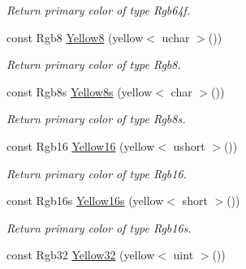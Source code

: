 \begin{DoxyCompactItemize}
\begin{DoxyCompactList}\small\item\em Return primary color of type Rgb64f. \end{DoxyCompactList}\item 
\hypertarget{group___primary_colors_gaa477e057905085ce9d5caa25e59b4d8e}{const Rgb8 \hyperlink{group___primary_colors_gaa477e057905085ce9d5caa25e59b4d8e}{Yellow8} (yellow$<$ uchar $>$())}\label{group___primary_colors_gaa477e057905085ce9d5caa25e59b4d8e}

\begin{DoxyCompactList}\small\item\em Return primary color of type Rgb8. \end{DoxyCompactList}\item 
\hypertarget{group___primary_colors_ga727cf787d43d7c9830a402d272403450}{const Rgb8s \hyperlink{group___primary_colors_ga727cf787d43d7c9830a402d272403450}{Yellow8s} (yellow$<$ char $>$())}\label{group___primary_colors_ga727cf787d43d7c9830a402d272403450}

\begin{DoxyCompactList}\small\item\em Return primary color of type Rgb8s. \end{DoxyCompactList}\item 
\hypertarget{group___primary_colors_gaa53c83b51a45b11eecace384bcca8dc8}{const Rgb16 \hyperlink{group___primary_colors_gaa53c83b51a45b11eecace384bcca8dc8}{Yellow16} (yellow$<$ ushort $>$())}\label{group___primary_colors_gaa53c83b51a45b11eecace384bcca8dc8}

\begin{DoxyCompactList}\small\item\em Return primary color of type Rgb16. \end{DoxyCompactList}\item 
\hypertarget{group___primary_colors_ga6746cbfaacce6d8bd3784dadc6565a35}{const Rgb16s \hyperlink{group___primary_colors_ga6746cbfaacce6d8bd3784dadc6565a35}{Yellow16s} (yellow$<$ short $>$())}\label{group___primary_colors_ga6746cbfaacce6d8bd3784dadc6565a35}

\begin{DoxyCompactList}\small\item\em Return primary color of type Rgb16s. \end{DoxyCompactList}\item 
\hypertarget{group___primary_colors_ga0bb20242e3e6cbf8e59716a25fb1e38f}{const Rgb32 \hyperlink{group___primary_colors_ga0bb20242e3e6cbf8e59716a25fb1e38f}{Yellow32} (yellow$<$ uint $>$())}\label{group___primary_colors_ga0bb20242e3e6cbf8e59716a25fb1e38f}


\end{DoxyCompactItemize}
